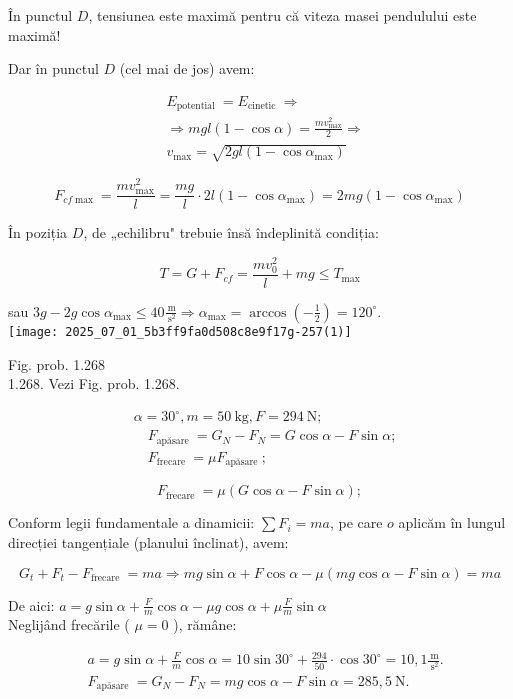 În punctul $D$, tensiunea este maximă pentru că viteza masei pendulului este maximă!

Dar în punctul $D$ (cel mai de jos) avem:

$$
\begin{aligned}
& E_{\text {potential }}=E_{\text {cinetic }} \Rightarrow \\
& \Rightarrow m g l(1-\cos \alpha)=\frac{m v_{\max }^{2}}{2} \Rightarrow \\
& v_{\max }=\sqrt{2 g l\left(1-\cos \alpha_{\max }\right)}
\end{aligned}
$$

$$
F_{c f \max }=\frac{m v_{\max }^{2}}{l}=\frac{m g}{l} \cdot 2 l\left(1-\cos \alpha_{\max }\right)=2 m g\left(1-\cos \alpha_{\max }\right)
$$

În poziția $D$, de „echilibru" trebuie însă îndeplinită condiția:

$$
T=G+F_{c f}=\frac{m v_{0}^{2}}{l}+m g \leq T_{\max }
$$

sau $3 g-2 g \cos \alpha_{\max } \leq 40 \frac{\mathrm{~m}}{\mathrm{~s}^{2}} \Rightarrow \alpha_{\max }=\arccos \left(-\frac{1}{2}\right)=120^{\circ}$.\\
\texttt{[image: 2025\_07\_01\_5b3ff9fa0d508c8e9f17g-257(1)]}

Fig. prob. 1.268\\
1.268. Vezi Fig. prob. 1.268.

$$
\begin{aligned}
& \alpha=30^{\circ}, m=50 \mathrm{~kg}, F=294 \mathrm{~N} ; \\
& \quad F_{\text {apăsare }}=G_{N}-F_{N}=G \cos \alpha-F \sin \alpha ; \\
& \quad F_{\text {frecare }}=\mu F_{\text {apăsare }} ;
\end{aligned}
$$

$$
F_{\text {frecare }}=\mu(G \cos \alpha-F \sin \alpha) ;
$$

Conform legii fundamentale a dinamicii: $\sum F_{i}=m a$, pe care $o$ aplicăm în lungul direcției tangențiale (planului înclinat), avem:

$$
G_{t}+F_{t}-F_{\text {frecare }}=m a \Rightarrow m g \sin \alpha+F \cos \alpha-\mu(m g \cos \alpha-F \sin \alpha)=m a
$$

De aici: $a=g \sin \alpha+\frac{F}{m} \cos \alpha-\mu g \cos \alpha+\mu \frac{F}{m} \sin \alpha$\\
Neglijând frecările ( $\mu=0$ ), rămâne:

$$
\begin{aligned}
& a=g \sin \alpha+\frac{F}{m} \cos \alpha=10 \sin 30^{\circ}+\frac{294}{50} \cdot \cos 30^{\circ}=10,1 \frac{\mathrm{~m}}{\mathrm{~s}^{2}} . \\
& F_{\text {apāsare }}=G_{N}-F_{N}=m g \cos \alpha-F \sin \alpha=285,5 \mathrm{~N} .
\end{aligned}
$$

